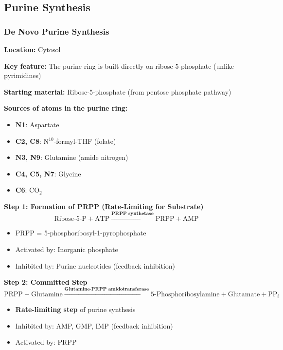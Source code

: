 \subsection{Purine Synthesis}

\subsubsection{De Novo Purine Synthesis}

\textbf{Location:} Cytosol

\textbf{Key feature:} The purine ring is built directly on ribose-5-phosphate (unlike pyrimidines)

\textbf{Starting material:} Ribose-5-phosphate (from pentose phosphate pathway)

\textbf{Sources of atoms in the purine ring:}
\begin{itemize}
    \item \textbf{N1}: Aspartate
    \item \textbf{C2, C8}: N$^{10}$-formyl-THF (folate)
    \item \textbf{N3, N9}: Glutamine (amide nitrogen)
    \item \textbf{C4, C5, N7}: Glycine
    \item \textbf{C6}: CO$_2$
\end{itemize}

\textbf{Step 1: Formation of PRPP (Rate-Limiting for Substrate)}
\[
\text{Ribose-5-P} + \text{ATP} \xrightarrow{\textbf{PRPP synthetase}} \text{PRPP} + \text{AMP}
\]
\begin{itemize}
    \item PRPP = 5-phosphoribosyl-1-pyrophosphate
    \item Activated by: Inorganic phosphate
    \item Inhibited by: Purine nucleotides (feedback inhibition)
\end{itemize}

\textbf{Step 2: Committed Step}
\[
\text{PRPP} + \text{Glutamine} \xrightarrow{\textbf{Glutamine-PRPP amidotransferase}} \text{5-Phosphoribosylamine} + \text{Glutamate} + \text{PP}_i
\]
\begin{itemize}
    \item \textbf{Rate-limiting step} of purine synthesis
    \item Inhibited by: AMP, GMP, IMP (feedback inhibition)
    \item Activated by: PRPP
\end{itemize}

